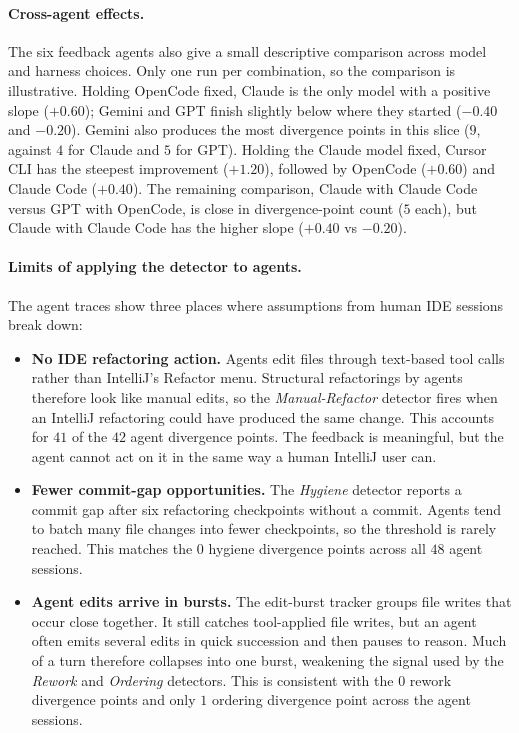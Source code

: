 \paragraph{Cross-agent effects.}
The six feedback agents also give a small descriptive comparison across model and harness choices. Only one run per combination, so the comparison is illustrative. Holding OpenCode fixed, Claude is the only model with a positive slope ($+0.60$); Gemini and GPT finish slightly below where they started ($-0.40$ and $-0.20$). Gemini also produces the most divergence points in this slice ($9$, against $4$ for Claude and $5$ for GPT). Holding the Claude model fixed, Cursor CLI has the steepest improvement ($+1.20$), followed by OpenCode ($+0.60$) and Claude Code ($+0.40$). The remaining comparison, Claude with Claude Code versus GPT with OpenCode, is close in divergence-point count ($5$ each), but Claude with Claude Code has the higher slope ($+0.40$ vs $-0.20$).

\paragraph{Limits of applying the detector to agents.}
\label{sec:results-userstudy-agent-limits}
The agent traces show three places where assumptions from human IDE sessions break down:

\begin{itemize}
    \item \textbf{No IDE refactoring action.} Agents edit files through text-based tool calls rather than IntelliJ's Refactor menu. Structural refactorings by agents therefore look like manual edits, so the \emph{Manual-Refactor} detector fires when an IntelliJ refactoring could have produced the same change. This accounts for $41$ of the $42$ agent divergence points. The feedback is meaningful, but the agent cannot act on it in the same way a human IntelliJ user can.
    \item \textbf{Fewer commit-gap opportunities.} The \emph{Hygiene} detector reports a commit gap after six refactoring checkpoints without a commit. Agents tend to batch many file changes into fewer checkpoints, so the threshold is rarely reached. This matches the $0$ hygiene divergence points across all $48$ agent sessions.
    \item \textbf{Agent edits arrive in bursts.} The edit-burst tracker groups file writes that occur close together. It still catches tool-applied file writes, but an agent often emits several edits in quick succession and then pauses to reason. Much of a turn therefore collapses into one burst, weakening the signal used by the \emph{Rework} and \emph{Ordering} detectors. This is consistent with the $0$ rework divergence points and only $1$ ordering divergence point across the agent sessions.
\end{itemize}

